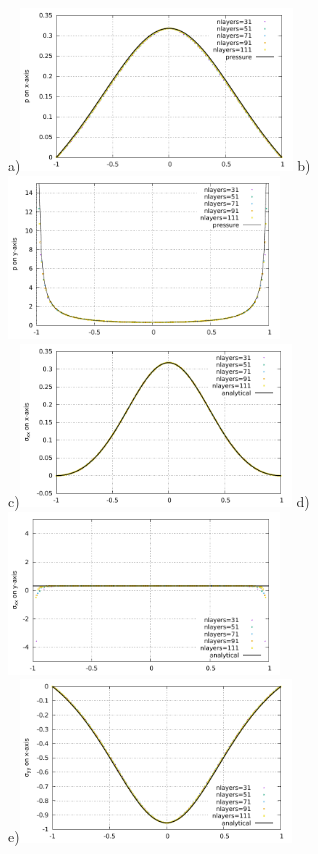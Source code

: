 \newpage
\begin{center}
a)\includegraphics[width=7.2cm]{python_codes/fieldstone_58/experiment1/press_xaxis.pdf}
b)\includegraphics[width=7.2cm]{python_codes/fieldstone_58/experiment1/press_yaxis.pdf}\\
c)\includegraphics[width=7.2cm]{python_codes/fieldstone_58/experiment1/sigmaxx_xaxis.pdf}
d)\includegraphics[width=7.2cm]{python_codes/fieldstone_58/experiment1/sigmaxx_yaxis.pdf}\\
e)\includegraphics[width=7.2cm]{python_codes/fieldstone_58/experiment1/sigmayy_xaxis.pdf}

\end{center}
